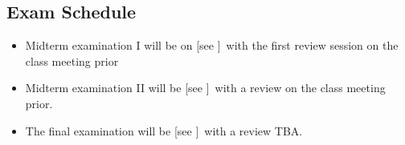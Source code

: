 
\subsection*{Exam Schedule}\label{subsec:exam_schedule}

\begin{itemize}
\itemsep -0.0em 
\item Midterm examination I will be on [see \coursewebpagelink]~with the first review session on the class meeting prior
\item Midterm examination II will be [see \coursewebpagelink]~with a review on the class meeting prior.
\item The final examination will be [see \coursewebpagelink]~with a review TBA.
\end{itemize}